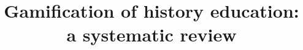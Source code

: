 \documentclass[a4paper,fleqn]{cas-sc}
\begin{document}
\let\WriteBookmarks\relax
\def\floatpagepagefraction{1}
\def\textpagefraction{.001}


\title[mode=title]{Gamification of history education: a systematic review}

%
%
%
%
%
%
%
%
%
%
%
\end{document}

